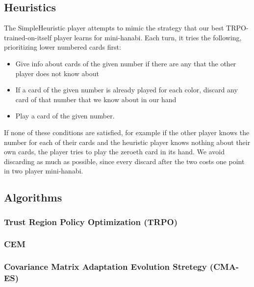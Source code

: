 \subsection{Heuristics}

The SimpleHeuristic player attempts to mimic the strategy that our best
TRPO-trained-on-itself player learns for mini-hanabi. Each turn, it tries the
following, prioritizing lower numbered cards first:

\begin{itemize}
\item Give info about cards of the given number if there are any that the other player does not know about
\item If a card of the given number is already played for each color, discard any card of that number that we know about in our hand
\item Play a card of the given number.
\end{itemize}

If none of these conditions are satisfied, for example if the other player
knows the number for each of their cards and the heuristic player knows
nothing about their own cards, the player tries to play the zeroeth card in
its hand. We avoid discarding as much as possible, since every discard after
the two costs one point in two player mini-hanabi.




\subsection{Algorithms}
%
%
\subsubsection{Trust Region Policy Optimization (TRPO)}
\cite{TRPO}
\subsubsection{CEM}
\subsubsection{Covariance Matrix Adaptation Evolution Stretegy (CMA-ES)}
~\cite{cmaes}





